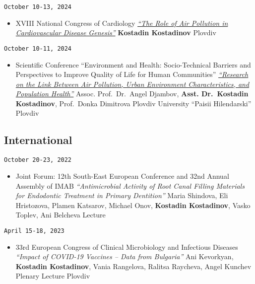 \documentclass[
  12pt,
  letterpaper,
  DIV=11,
  numbers=noendperiod]{scrartcl}
\providecommand{\tightlist}{%
  \setlength{\itemsep}{0pt}\setlength{\parskip}{0pt}}\usepackage{longtable,booktabs,array}
\begin{document}
\texttt{October\ 10-13,\ 2024}

\begin{itemize}
\tightlist
\item
  XVIII National Congress of Cardiology \textbar{}
  \emph{\href{https://www.bgcardio.org/storage/app/media/uploaded-files/XVIII\%20Congress\%20program_web.pdf}{``The
  Role of Air Pollution in Cardiovascular Disease Genesis''}} \textbar{}
  \textbf{Kostadin Kostadinov} \textbar{} Plovdiv
\end{itemize}

\texttt{October\ 10-11,\ 2024}

\begin{itemize}
\tightlist
\item
  Scientific Conference ``Environment and Health: Socio-Technical
  Barriers and Perspectives to Improve Quality of Life for Human
  Communities'' \textbar{}
  \emph{\href{https://hiddeneurope-jeanmonnet.uni-plovdiv.net/2024/10/\%d0\%bf\%d1\%80\%d0\%be\%d0\%b3\%d1\%80\%d0\%b0\%d0\%bc\%d0\%b0-\%d0\%bd\%d0\%b0-\%d0\%bd\%d0\%b0\%d1\%83\%d1\%87\%d0\%bd\%d0\%b0\%d1\%82\%d0\%b0-\%d0\%ba\%d0\%be\%d0\%bd\%d1\%84\%d0\%b5\%d1\%80\%d0\%b5\%d0\%bd\%d1\%86\%d0\%b8\%d1\%8f-\%d0\%be\%d0\%ba/}{``Research
  on the Link Between Air Pollution, Urban Environment Characteristics,
  and Population Health''}} \textbar{} Assoc. Prof.~Dr.~Angel Djambov,
  \textbf{Asst. Dr.~Kostadin Kostadinov}, Prof.~Donka Dimitrova
  \textbar{} Plovdiv University ``Paisii Hilendarski'' \textbar{}
  Plovdiv
\end{itemize}

\subsection{International}\label{international-1}

\texttt{October\ 20-23,\ 2022}

\begin{itemize}
\tightlist
\item
  Joint Forum: 12th South-East European Conference and 32nd Annual
  Assembly of IMAB \textbar{} \emph{``Antimicrobial Activity of Root
  Canal Filling Materials for Endodontic Treatment in Primary
  Dentition''} \textbar{} Maria Shindova, Eli Hristozova, Plamen
  Katsarov, Michael Onov, \textbf{Kostadin Kostadinov}, Vasko Toplev,
  Ani Belcheva \textbar{} Lecture
\end{itemize}

\texttt{April\ 15-18,\ 2023}

\begin{itemize}
\tightlist
\item
  33rd European Congress of Clinical Microbiology and Infectious
  Diseases \textbar{} \emph{``Impact of COVID-19 Vaccines -- Data from
  Bulgaria''} \textbar{} Ani Kevorkyan, \textbf{Kostadin Kostadinov},
  Vania Rangelova, Ralitsa Raycheva, Angel Kunchev \textbar{} Plenary
  Lecture \textbar{} Plovdiv
\end{itemize}
\end{document}
